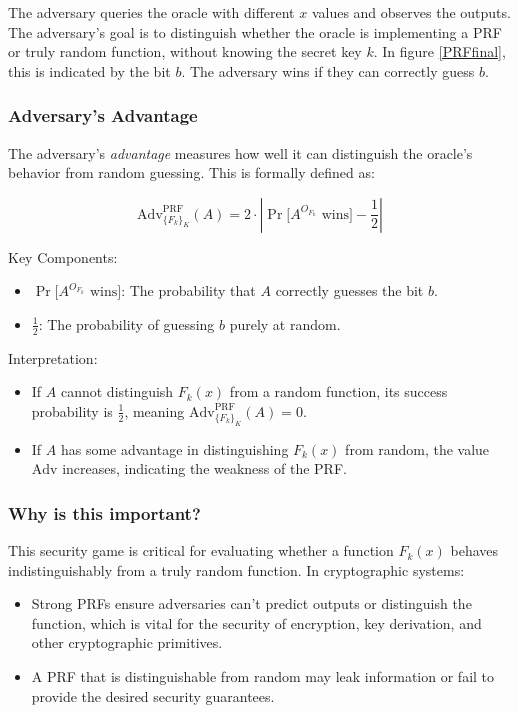 The adversary queries the oracle with different $x$ values and observes the outputs. The adversary's goal is to distinguish whether the oracle is implementing a PRF or truly random function, without knowing the secret key $k$. In figure \ref{PRFfinal}, this is indicated by the bit $b$. The adversary wins if they can correctly guess $b$.

\subsubsection{Adversary's Advantage}

The adversary's \textit{advantage} measures how well it can distinguish the oracle's behavior from random guessing. This is formally defined as:

\[
\text{Adv}_{\{F_k\}_K}^{\text{PRF}}(A) = 2 \cdot \left| \Pr\big[A^{O_{F_k}} \text{ wins}\big] - \frac{1}{2} \right|
\]

Key Components:
\begin{itemize}
    \item \( \Pr\big[A^{O_{F_k}} \text{ wins}\big] \): The probability that \( A \) correctly guesses the bit \( b \).
    \item \( \frac{1}{2} \): The probability of guessing \( b \) purely at random.
\end{itemize}

Interpretation:
\begin{itemize}
    \item If \( A \) cannot distinguish \( F_k(x) \) from a random function, its success probability is \( \frac{1}{2} \), meaning \( \text{Adv}_{\{F_k\}_K}^{\text{PRF}}(A) = 0 \).
    \item If \( A \) has some advantage in distinguishing \( F_k(x) \) from random, the value \( \text{Adv} \) increases, indicating the weakness of the PRF.
\end{itemize}

\subsubsection{Why is this important?}
This security game is critical for evaluating whether a function $F_k(x)$ behaves indistinguishably from a truly random function. In cryptographic systems:
\begin{itemize}
    \item Strong PRFs ensure adversaries can't predict outputs or distinguish the function, which is vital for the security of encryption, key derivation, and other cryptographic primitives.
    \item A PRF that is distinguishable from random may leak information or fail to provide the desired security guarantees.
\end{itemize}

